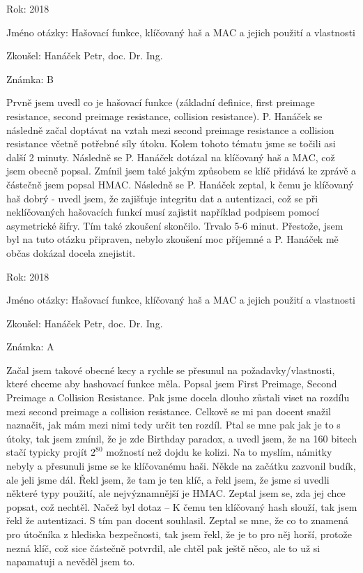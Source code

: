 \begin{compactitem}
    \item Rok: 2018
    \item Jméno otázky: Hašovací funkce, klíčovaný haš a MAC a jejich použití a vlastnosti
    \item Zkoušel: Hanáček Petr, doc. Dr. Ing.
    \item Známka: B
    \item Prvně jsem uvedl co je hašovací funkce (základní definice, first preimage resistance, second preimage resistance, collision resistance). P. Hanáček se následně začal doptávat na vztah mezi second preimage resistance a collision resistance včetně potřebné síly útoku. Kolem tohoto tématu jsme se točili asi další 2 minuty. Následně se P. Hanáček dotázal na klíčovaný haš a MAC, což jsem obecně popsal. Zmínil jsem také jakým způsobem se klíč přidává ke zprávě a částečně jsem popsal HMAC. Následně se P. Hanáček zeptal, k čemu je klíčovaný haš dobrý - uvedl jsem, že zajišťuje integritu dat a autentizaci, což se při neklíčovaných hašovacích funkcí musí zajistit například podpisem pomocí asymetrické šifry. Tím také zkoušení skončilo. Trvalo 5-6 minut. Přestože, jsem byl na tuto otázku připraven, nebylo zkoušení moc příjemné a P. Hanáček mě občas dokázal docela znejistit.
\end{compactitem}

\begin{compactitem}
    \item Rok: 2018
    \item Jméno otázky: Hašovací funkce, klíčovaný haš a MAC a jejich použití a vlastnosti
    \item Zkoušel: Hanáček Petr, doc. Dr. Ing.
    \item Známka: A
    \item Začal jsem takové obecné kecy a rychle se přesunul na požadavky/vlastnosti, které chceme aby hashovací funkce měla. Popsal jsem First Preimage, Second Preimage a Collision Resistance. Pak jsme docela dlouho zůstali viset na rozdílu mezi second preimage a collision resistance. Celkově se mi pan docent snažil naznačit, jak mám mezi nimi tedy určit ten rozdíl. Ptal se mne pak jak je to s útoky, tak jsem zmínil, že je zde Birthday paradox, a uvedl jsem, že na 160 bitech stačí typicky projít $2^{80}$ možností než dojdu ke kolizi. Na to myslím, námitky nebyly a přesunuli jsme se ke klíčovanému haši. Někde na začátku zazvonil budík, ale jeli jsme dál. Řekl jsem, že tam je ten klíč, a řekl jsem, že jsme si uvedli některé typy použití, ale nejvýznamnější je HMAC. Zeptal jsem se, zda jej chce popsat, což nechtěl. Načež byl dotaz -- K čemu ten klíčovaný hash slouží, tak jsem řekl že autentizaci. S tím pan docent souhlasil. Zeptal se mne, že co to znamená pro útočníka z hlediska bezpečnosti, tak jsem řekl, že je to pro něj horší, protože nezná klíč, což sice částečně potvrdil, ale chtěl pak ještě něco, ale to už si napamatuji a nevěděl jsem to.
\end{compactitem}

